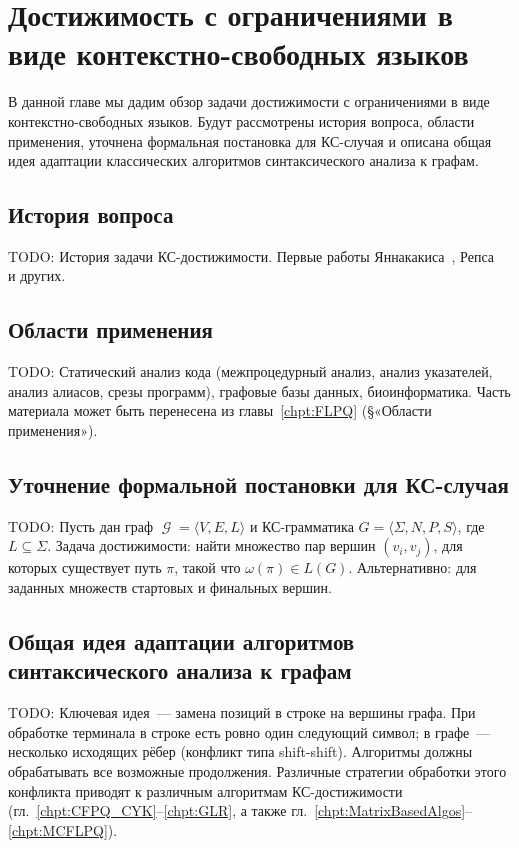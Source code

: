 \setchapterpreamble[u]{\margintoc}
\chapter{Достижимость с ограничениями в виде контекстно-свободных языков}
\label{chpt:CFPQ_Overview}

В данной главе мы дадим обзор задачи достижимости с ограничениями в виде контекстно-свободных языков.
Будут рассмотрены история вопроса, области применения, уточнена формальная постановка для КС-случая и описана общая идея адаптации классических алгоритмов синтаксического анализа к графам.

\section{История вопроса}

TODO: История задачи КС-достижимости. Первые работы Яннакакиса~, Репса~ и других.

\section{Области применения}

TODO: Статический анализ кода (межпроцедурный анализ, анализ указателей, анализ алиасов, срезы программ), графовые базы данных, биоинформатика.
Часть материала может быть перенесена из главы~\ref{chpt:FLPQ} (§«Области применения»).

\section{Уточнение формальной постановки для КС-случая}

TODO: Пусть дан граф $\mscrG = \langle V, E, L \rangle$ и КС-грамматика $G = \langle \Sigma, N, P, S \rangle$, где $L \subseteq \Sigma$.
Задача достижимости: найти множество пар вершин $(v_i, v_j)$, для которых существует путь $\pi$, такой что $\omega(\pi) \in L(G)$.
Альтернативно: для заданных множеств стартовых и финальных вершин.

\section{Общая идея адаптации алгоритмов синтаксического анализа к графам}

TODO: Ключевая идея~--- замена позиций в строке на вершины графа.
При обработке терминала в строке есть ровно один следующий символ; в графе~--- несколько исходящих рёбер (конфликт типа shift-shift).
Алгоритмы должны обрабатывать все возможные продолжения.
Различные стратегии обработки этого конфликта приводят к различным алгоритмам КС-достижимости (гл.~\ref{chpt:CFPQ_CYK}--\ref{chpt:GLR}, а также гл.~\ref{chpt:MatrixBasedAlgos}--\ref{chpt:MCFLPQ}).

